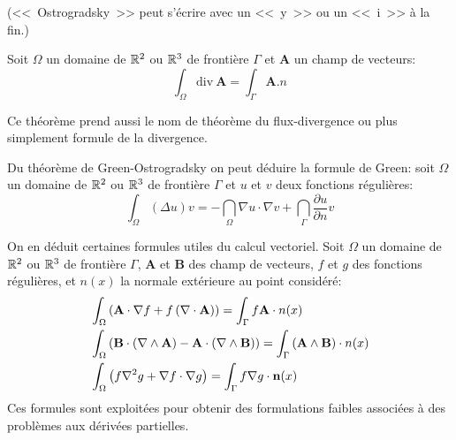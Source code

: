 \ifVersionDuDocEstVincent\medskip\fi
\begin{theoreme}%
%
(<<~Ostrogradsky~>> peut s'écrire avec un <<~y~>> ou un <<~i~>> à la fin.)
\ifVersionDuDocEstVincent\medskip\fi
{}

Soit $\Omega$ un domaine de $\mathbb R^2$ ou $\mathbb R^3$ de frontière $\Gamma$
et ${\mathbf{A} }$ un champ de vecteurs:
\begin{equation}
    \int_\Omega \mathrm{div}\ {\mathbf{A} }  = \int_\Gamma {\mathbf{A} }.n
\end{equation}
\end{theoreme}

\ifVersionDuDocEstVincent\medskip\fi
Ce théorème prend aussi le nom de théorème du flux-divergence ou plus simplement formule de la
divergence.

\begin{theoreme}
Du théorème de Green-Ostrogradsky on peut déduire la  formule de Green:
soit $\Omega$ un domaine de $\mathbb R^2$ ou $\mathbb R^3$ de frontière $\Gamma$
et $u$ et $v$ deux fonctions régulières:
\begin{equation}
    \int_\Omega (\Delta u)v = -\dint_\Omega \nabla u\cdot\nabla v + \dint_\Gamma \dfrac{\partial u}{\partial n}v
\end{equation}
\end{theoreme}

\ifVersionDuDocEstVincent\medskip\fi
On en déduit certaines formules utiles du calcul vectoriel.
Soit $\Omega$ un domaine de $\mathbb R^2$ ou $\mathbb R^3$ de frontière $\Gamma$,
${\mathbf{A} }$ et ${\mathbf{B} }$ des champ de vecteurs, $f$ et $g$ des
fonctions régulières, et $n(x)$ la normale extérieure au point considéré:
\begin{align}
    &\int_\Omega \left( {\mathbf{A} }\cdot \nabla f + f \left(\nabla \cdot {\mathbf{A} }\right)\right)=
   \int_\Gamma f {\mathbf{A} }\cdot n(x)\\
&\int_\Omega \left( {\mathbf{B} }\cdot\left(\nabla \wedge {\mathbf{A} }\right) - {\mathbf{A} }\cdot \left(\nabla
\wedge {\mathbf{B} }\right) \right)
= \int_\Gamma \left({\mathbf{A} } \wedge {\mathbf{B} }\right)\cdot n(x)\\
&\int_\Omega \left( f \nabla^{2} g + \nabla f \cdot \nabla g \right)
= \int_\Gamma f \nabla g \cdot \mathbf{n}(x)
\end{align}
Ces formules sont exploitées pour obtenir des formulations faibles associées à des problèmes aux dérivées partielles. 